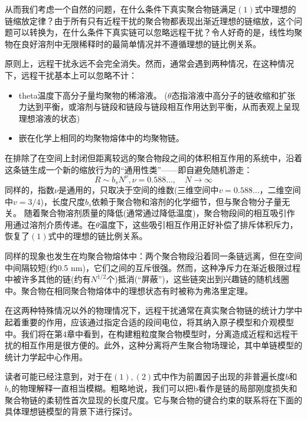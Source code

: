 \documentclass[UTF8]{ctexart}
\begin{document}
从而我们考虑一个自然的问题，在什么条件下真实聚合物链满足$(1)$式中理想的链缩放定律？由于所有只有近程干扰的聚合物都表现出渐近理想的链缩放，这个问题可以转换为，在什么条件下真实链可以忽略远程干扰？令人好奇的是，线性均聚物在良好溶剂中无限稀释时的最简单情况并不遵循理想的链比例关系。

原则上，远程干扰永远不会完全消失。然而，通常会遇到两种情况，在这种情况下，远程干扰基本上可以忽略不计：
\begin{itemize}
	\item theta温度下高分子量均聚物的稀溶液。
	($\theta$态指溶液中高分子的链收缩和扩张力达到平衡，或溶剂与链段和链段与链段相互作用达到平衡，从而表观上呈现理想溶液的状态)
	\item 嵌在化学上相同的均聚物熔体中的均聚物链。
\end{itemize}

在排除了在空间上封闭但距离较远的聚合物段之间的体积相互作用的系统中，沿着这条链生成一个新的缩放行为的“通用性类”——即自避免随机游走：
\begin{equation}
R \sim b _ { s } N ^ { \nu } , \nu = 0.588 \ldots , \quad N \rightarrow \infty
\end{equation}
同样的，指数$\nu$是通用的，只取决于空间的维数(三维空间中$ v = 0.588 \dots$，二维空间中$ v =3/4 $)，长度尺度$b_s$依赖于聚合物和溶剂的化学细节，但与聚合物分子量无关。
随着聚合物溶剂质量的降低(通常通过降低温度)，聚合物段间的相互吸引作用通过溶剂介质传递。在$\theta$温度下，这些吸引相互作用正好补偿了排斥体积斥力，恢复了$(1)$式中的理想的链比例关系。

同样的现象也发生在均聚合物熔体中：两个聚合物段沿着同一条链远离，但在空间中间隔较短(约0.5 nm)，它们之间的互斥很强。然而，这种净斥力在渐近极限过程中被许多其他的链(约有$N^{1/2}$个)抵消(“屏蔽”)，这些链突出到兴趣链的随机线圈中。聚合物在相同聚合物熔体中的理想状态有时被称为弗洛里定理。

在这两种特殊情况以外的物理情况下，远程干扰通常在真实聚合物链的统计力学中起着重要的作用，应该通过指定合适的段间电位，将其纳入原子模型和介观模型中。我们将在第4章中看到，在构建粗粒度聚合物模型时，分离造成近程和远程干扰的相互作用是很方便的。此外，这种分离将产生聚合物场理论，其中单链模型的统计力学起中心作用。

读者可能已经注意到，对于在$(1),(2)$式中作为前置因子出现的非普遍长度$b$和$b_s$的物理解释一直相当模糊。粗略地说，我们可以把b看作是链的局部刚度损失和聚合物链的柔韧性首次显现的长度尺度。它与聚合物的键合约束的联系将在下面的具体理想链模型的背景下进行探讨。
\end{document}
